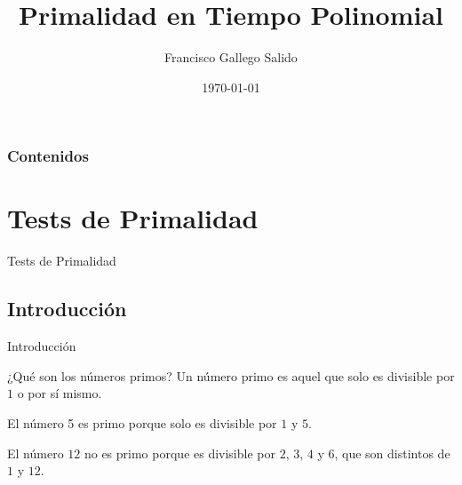 \documentclass{beamer}
\title[Primalidad en Tiempo Polinomial]{Primalidad en Tiempo Polinomial} %
\author{Francisco Gallego Salido} %
\institute[UGR] %
{
  Universidad de Granada \\ %
  \medskip
  \textit{fgallego@correo.ugr.es} %
}
\date{\today} %
\begin{document}
\begin{frame}
\titlepage %
\end{frame}

\begin{frame}
  \frametitle{Contenidos} %
  \tableofcontents
\end{frame}




\section{Tests de Primalidad}

\begin{frame}
	\centering
	\begin{Huge}
		Tests de Primalidad
	\end{Huge}
\end{frame}

\subsection{Introducción}

\begin{frame}
	\centering
	\begin{Large}
		Introducción
	\end{Large}
\end{frame}

\begin{frame}{¿Qué son los números primos?}
	Un número primo es aquel que solo es divisible por $1$ o por sí mismo.\break
	
	\begin{example}
		El número 5 es primo porque solo es divisible por $1$ y $5$.
	\end{example}
	
	\begin{example}
		El número $12$ no es primo porque es divisible por $2$, $3$, $4$ y $6$, que son distintos de $1$ y $12$.
	\end{example}
\end{frame}
\end{document}
